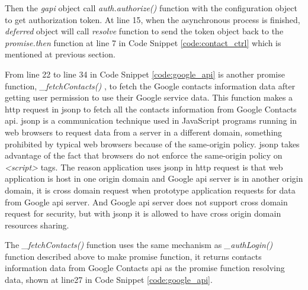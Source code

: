 \par Then the \textit{gapi} object call \textit{auth.authorize()} function with the configuration object to get authorization token. At line 15, when the asynchronous process is finished, \textit{deferred} object will call \textit{resolve} function to send the token object back to the \textit{promise.then} function at line 7 in Code Snippet \ref{code:contact_ctrl} which is mentioned at previous section.

\par From line 22 to line 34 in Code Snippet \ref{code:google_api} is another promise function, \textit{\_fetchContacts()} , to fetch the Google contacts information data after getting user permission to use their Google service data. This function makes a \gls{http} request in \gls{jsonp} to fetch all the contacts information from Google Contacts \gls{api}. \gls{jsonp} is a communication technique used in JavaScript programs running in web browsers to request data from a server in a different domain, something prohibited by typical web browsers because of the same-origin policy. \gls{jsonp} takes advantage of the fact that browsers do not enforce the same-origin policy on \textit{<script>} tags\cite{wiki:jsonp}. The reason application uses \gls{jsonp} in \gls{http} request is that web application is host in one origin domain and Google \gls{api} server is in another origin domain, it is cross domain request when prototype application requests for data from Google \gls{api} server. And Google \gls{api} server does not support cross domain request for security, but with \gls{jsonp} it is allowed to have cross origin domain resources sharing.

\par The \textit{\_fetchContacts()} function uses the same mechanism as \textit{\_authLogin()} function described above to make promise function, it returns contacts information data from Google Contacts \gls{api} as the promise function resolving data, shown at line27 in Code Snippet \ref{code:google_api}.

